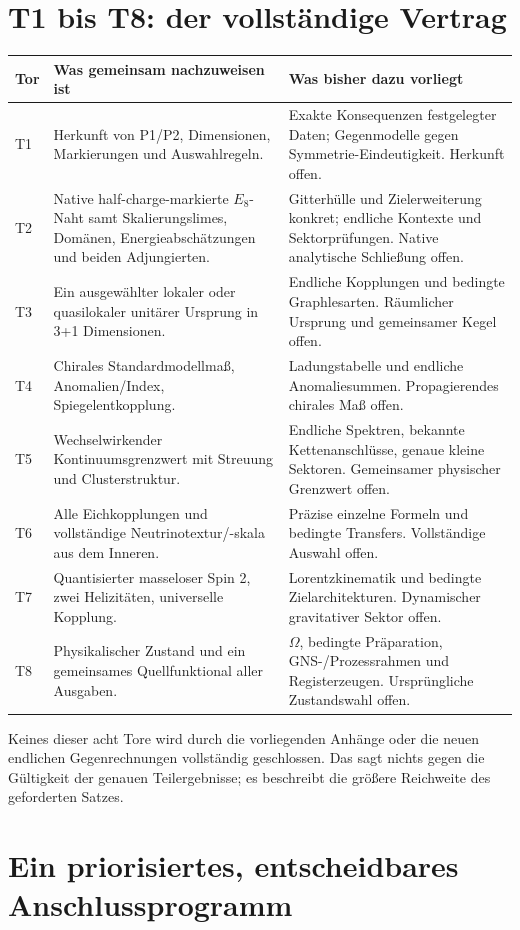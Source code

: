 \section{T1 bis T8: der vollständige Vertrag}
\begin{longtable}{L{9mm}L{62mm}L{79mm}}
\toprule \textbf{Tor}&\textbf{Was gemeinsam nachzuweisen ist}&\textbf{Was bisher dazu vorliegt}\\\midrule\endhead
T1&Herkunft von P1/P2, Dimensionen, Markierungen und Auswahlregeln.&Exakte Konsequenzen festgelegter Daten; Gegenmodelle gegen Symmetrie-Eindeutigkeit. Herkunft offen.\\
T2&Native half-charge-markierte $E_8$-Naht samt Skalierungslimes, Domänen, Energieabschätzungen und beiden Adjungierten.&Gitterhülle und Zielerweiterung konkret; endliche Kontexte und Sektorprüfungen. Native analytische Schließung offen.\\
T3&Ein ausgewählter lokaler oder quasilokaler unitärer Ursprung in 3+1 Dimensionen.&Endliche Kopplungen und bedingte Graphlesarten. Räumlicher Ursprung und gemeinsamer Kegel offen.\\
T4&Chirales Standardmodellmaß, Anomalien/Index, Spiegelentkopplung.&Ladungstabelle und endliche Anomaliesummen. Propagierendes chirales Maß offen.\\
T5&Wechselwirkender Kontinuumsgrenzwert mit Streuung und Clusterstruktur.&Endliche Spektren, bekannte Kettenanschlüsse, genaue kleine Sektoren. Gemeinsamer physischer Grenzwert offen.\\
T6&Alle Eichkopplungen und vollständige Neutrinotextur/-skala aus dem Inneren.&Präzise einzelne Formeln und bedingte Transfers. Vollständige Auswahl offen.\\
T7&Quantisierter masseloser Spin 2, zwei Helizitäten, universelle Kopplung.&Lorentzkinematik und bedingte Zielarchitekturen. Dynamischer gravitativer Sektor offen.\\
T8&Physikalischer Zustand und ein gemeinsames Quellfunktional aller Ausgaben.&$\Omega$, bedingte Präparation, GNS-/Prozessrahmen und Registerzeugen. Ursprüngliche Zustandswahl offen.\\\bottomrule
\end{longtable}
Keines dieser acht Tore wird durch die vorliegenden Anhänge oder die neuen endlichen Gegenrechnungen vollständig geschlossen. Das sagt nichts gegen die Gültigkeit der genauen Teilergebnisse; es beschreibt die größere Reichweite des geforderten Satzes.

\section{Ein priorisiertes, entscheidbares Anschlussprogramm}


